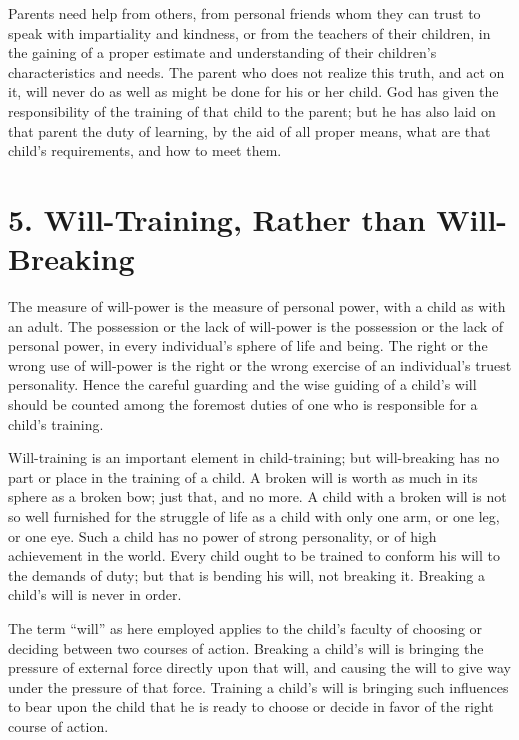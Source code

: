 \documentclass[
]{book}
\begin{document}
Parents need help from others, from personal friends whom they can trust to speak with impartiality and kindness, or from the teachers of their children, in the gaining of a proper estimate and understanding of their children's characteristics and needs. The parent who does not realize this truth, and act on it, will never do as well as might be done for his or her child. God has given the responsibility of the training of that child to the parent; but he has also laid on that parent the duty of learning, by the aid of all proper means, what are that child's requirements, and how to meet them.

\hypertarget{will-training-rather-than-will-breaking}{%
\chapter{5. Will-Training, Rather than Will-Breaking}\label{will-training-rather-than-will-breaking}}

The measure of will-power is the measure of personal power, with a child as with an adult. The possession or the lack of will-power is the possession or the lack of personal power, in every individual's sphere of life and being. The right or the wrong use of will-power is the right or the wrong exercise of an individual's truest personality. Hence the careful guarding and the wise guiding of a child's will should be counted among the foremost duties of one who is responsible for a child's training.

Will-training is an important element in child-training; but will-breaking has no part or place in the training of a child. A broken will is worth as much in its sphere as a broken bow; just that, and no more. A child with a broken will is not so well furnished for the struggle of life as a child with only one arm, or one leg, or one eye. Such a child has no power of strong personality, or of high achievement in the world. Every child ought to be trained to conform his will to the demands of duty; but that is bending his will, not breaking it. Breaking a child's will is never in order.

The term ``will'' as here employed applies to the child's faculty of choosing or deciding between two courses of action. Breaking a child's will is bringing the pressure of external force directly upon that will, and causing the will to give way under the pressure of that force. Training a child's will is bringing such influences to bear upon the child that he is ready to choose or decide in favor of the right course of action.
\end{document}

